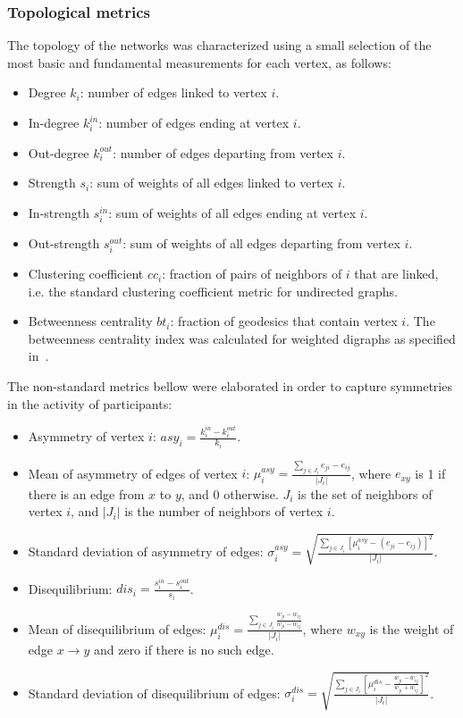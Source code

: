 \documentclass[%
	aip,
	jmp,%
	amsmath,amssymb,
	reprint,%
]{revtex4-1}
\begin{document}
\subsubsection{Topological metrics}\label{measures}

The topology of the networks was characterized 
using a small selection of the most basic and 
fundamental measurements for each vertex, as follows:

\begin{itemize}
	\item Degree     $k_i$: number of edges linked to vertex $i$.
	\item In-degree  $k_i^{in}$: number of edges ending at vertex $i$.
	\item Out-degree $k_i^{out}$: number of edges departing from vertex $i$.
	\item Strength $s_i$: sum of weights of all edges linked to vertex $i$.
	\item In-strength $s_i^{in}$: sum of weights of all edges ending at vertex $i$.
	\item Out-strength $s_i^{out}$: sum of weights of all edges departing from vertex $i$.
	\item Clustering coefficient $cc_i$: fraction of pairs of neighbors of $i$ that are linked, i.e. the standard clustering coefficient metric for undirected graphs.
	\item Betweenness centrality $bt_i$: fraction of geodesics that contain vertex $i$. The betweenness centrality index was calculated for weighted digraphs as specified in~\cite{faster}.
\end{itemize}

The non-standard metrics bellow were elaborated
in order to capture symmetries in the activity of participants:

\begin{itemize}
	\item Asymmetry of vertex $i$: $asy_i=\frac{k_i^{in}-k_i^{out}}{k_i}$.
	\item Mean of asymmetry of edges of vertex $i$: $\mu_i^{asy}=\frac{\sum_{j\in J_i} e_{ji}-e_{ij}}{|J_i|}$, where $e_{xy}$ is 1 if there is an edge from $x$ to $y$, and $0$ otherwise. $J_i$ is the set of neighbors of vertex $i$, and $|J_i|$ is the number of neighbors of vertex $i$.
	\item Standard deviation of asymmetry of edges: $\sigma_i^{asy}=\sqrt{\frac{\sum_{j\in J_i}[\mu^{asy}_i -(e_{ji}-e_{ij}) ]^2  }{|J_i|}  }$.
	\item Disequilibrium: $dis_i=\frac{s_i^{in}-s_i^{out}}{s_i}$.
	\item Mean of disequilibrium of edges: $\mu_i^{dis}=\frac{\sum_{j \in J_i}\frac{w_{ji}-w_{ij}}{w_{ji}-w_{ij}}}{|J_i|}$, where $w_{xy}$ is the weight of edge $x\rightarrow y$ and zero if there is no such edge.
	\item Standard deviation of disequilibrium of edges: $\sigma_i^{dis}=\sqrt{\frac{\sum_{j\in J_i}\left[\mu^{dis}_i-\frac{w_{ji}-w_{ij}}{w_{ji}+w_{ij}}\right]^2}{|J_i|}}$.
\end{itemize}
\end{document}
